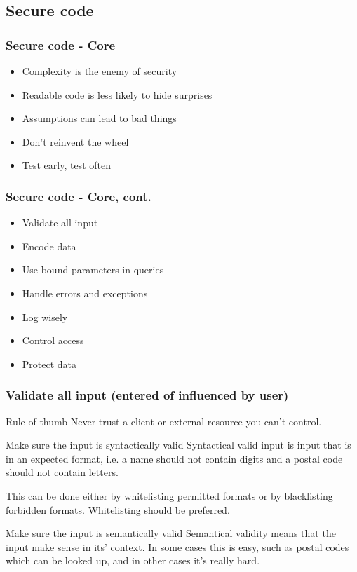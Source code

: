 \documentclass{beamer}
\begin{document}
  \subsection{Secure code}
    \begin{frame}
      \frametitle{Secure code - Core}
      \begin{itemize}
        \item Complexity is the enemy of security
        \item Readable code is less likely to hide surprises
        \item Assumptions can lead to bad things
        \item Don't reinvent the wheel
        \item Test early, test often
      \end{itemize}
    \end{frame}
    \begin{frame}
      \frametitle{Secure code - Core, cont.}
      \begin{itemize}
        \item Validate all input
        \item Encode data
        \item Use bound parameters in queries
        \item Handle errors and exceptions
        \item Log wisely
        \item Control access
        \item Protect data
      \end{itemize}
    \end{frame}
    \begin{frame}
      \frametitle{Validate all input (entered of influenced by user)}
      \begin{block}{Rule of thumb}
        Never trust a client or external resource you can't control.
      \end{block}
      \begin{block}{Make sure the input is syntactically valid}
        Syntactical valid input is input that is in an expected format, i.e.
        a name should not contain digits and a postal code should not contain letters.

        This can be done either by whitelisting permitted formats or by blacklisting
        forbidden formats. Whitelisting should be preferred.
      \end{block}
      \begin{block}{Make sure the input is semantically valid}
        Semantical validity means that the input make sense in its' context. In some
        cases this is easy, such as postal codes which can be looked up, and in other
        cases it's really hard.
      \end{block}
    \end{frame}
\end{document}
